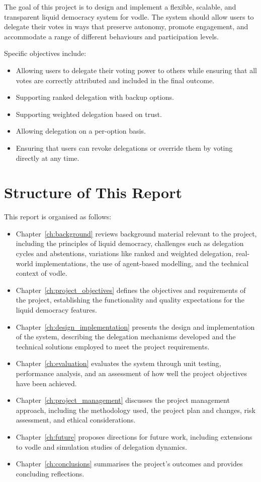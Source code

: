 The goal of this project is to design and implement a flexible, scalable, and transparent liquid democracy system for vodle. The system should allow users to delegate their votes in ways that preserve autonomy, promote engagement, and accommodate a range of different behaviours and participation levels.

Specific objectives include:
\begin{itemize}
    \item Allowing users to delegate their voting power to others while ensuring that all votes are correctly attributed and included in the final outcome.
    \item Supporting ranked delegation with backup options.
    \item Supporting weighted delegation based on trust.
    \item Allowing delegation on a per-option basis.
    \item Ensuring that users can revoke delegations or override them by voting directly at any time.
\end{itemize}

\section{Structure of This Report}

This report is organised as follows:

\begin{itemize}
    \item Chapter~\ref{ch:background} reviews background material relevant to the project, including the principles of liquid democracy, challenges such as delegation cycles and abstentions, variations like ranked and weighted delegation, real-world implementations, the use of agent-based modelling, and the technical context of vodle.
    \item Chapter~\ref{ch:project_objectives} defines the objectives and requirements of the project, establishing the functionality and quality expectations for the liquid democracy features.
    \item Chapter~\ref{ch:design_implementation} presents the design and implementation of the system, describing the delegation mechanisms developed and the technical solutions employed to meet the project requirements.
    \item Chapter~\ref{ch:evaluation} evaluates the system through unit testing, performance analysis, and an assessment of how well the project objectives have been achieved.
    \item Chapter~\ref{ch:project_management} discusses the project management approach, including the methodology used, the project plan and changes, risk assessment, and ethical considerations.
    \item Chapter~\ref{ch:future} proposes directions for future work, including extensions to vodle and simulation studies of delegation dynamics.
    \item Chapter~\ref{ch:conclusions} summarises the project's outcomes and provides concluding reflections.
\end{itemize}
